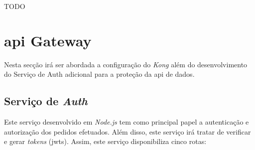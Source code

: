 TODO

\section{\acrshort{api} Gateway}

Nesta secção irá ser abordada a configuração do \textit{Kong} além do desenvolvimento do Serviço de Auth adicional para a proteção da \acrshort{api} de dados.

\subsection{Serviço de \textit{Auth}}
Este serviço desenvolvido em \textit{Node.js} tem como principal papel a autenticação e autorização dos pedidos efetuados. Além disso, este serviço irá tratar de verificar e gerar \textit{tokens} (\acrshort{jwt}s). Assim, este serviço disponibiliza cinco rotas:
